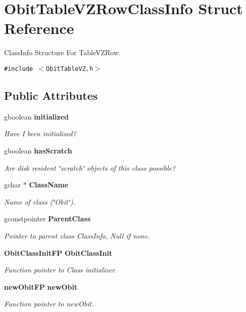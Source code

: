 \section{Obit\-Table\-VZRow\-Class\-Info Struct Reference}
\label{structObitTableVZRowClassInfo}
Class\-Info Structure For Table\-VZRow.  


{\tt \#include $<$Obit\-Table\-VZ.h$>$}

\subsection*{Public Attributes}
\begin{CompactItemize}
\item 
gboolean {\bf initialized}
\begin{CompactList}\small\item\em Have I been initialized? \item\end{CompactList}\item 
gboolean {\bf has\-Scratch}
\begin{CompactList}\small\item\em Are disk resident \char`\"{}scratch\char`\"{} objects of this class possible? \item\end{CompactList}\item 
gchar $\ast$ {\bf Class\-Name}
\begin{CompactList}\small\item\em Name of class (\char`\"{}Obit\char`\"{}). \item\end{CompactList}\item 
gconstpointer {\bf Parent\-Class}
\begin{CompactList}\small\item\em Pointer to parent class Class\-Info, Null if none. \item\end{CompactList}\item 
{\bf Obit\-Class\-Init\-FP} {\bf Obit\-Class\-Init}
\begin{CompactList}\small\item\em Function pointer to Class initializer. \item\end{CompactList}\item 
{\bf new\-Obit\-FP} {\bf new\-Obit}
\begin{CompactList}\small\item\em Function pointer to new\-Obit. \item\end{CompactList}\item 

\end{CompactItemize}
